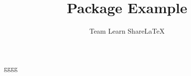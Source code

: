 \documentclass{article}
\title{Package Example}
\author{Team Learn ShareLaTeX}
\date{ }
\begin{document}

gggg
\end{document}
